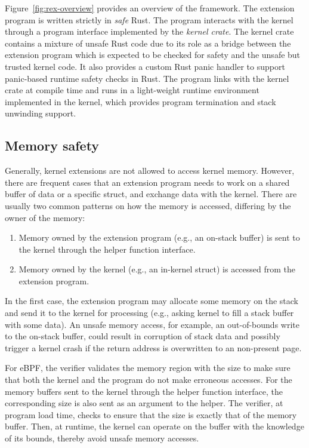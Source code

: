 Figure~\ref{fig:rex-overview} provides an overview of the \projname{} framework.
The extension program is written strictly in \emph{safe} Rust.
The program interacts with the kernel through a program interface implemented
    by the \projname{} \emph{kernel crate}.
The kernel crate contains a mixture of unsafe Rust code due to its role as a
    bridge between the extension program which is expected to be checked for
    safety and the unsafe but trusted kernel code.
It also provides a custom Rust panic handler to support panic-based runtime
    safety checks in Rust.
The program links with the kernel crate at compile time and runs in a
    light-weight runtime environment implemented in the kernel, which provides
    program termination and stack unwinding support.

\subsection{Memory safety}
\label{principle:memsafety}
Generally, kernel extensions are not allowed to access kernel memory.
However, there are frequent cases that an extension program needs to work on a
    shared buffer of data or a specific struct, and exchange data with the
    kernel.
There are usually two common patterns on how the memory is accessed, differing
    by the owner of the memory:
\begin{enumerate}
    \item Memory owned by the extension program (e.g., an on-stack buffer)
        is sent to the kernel through the helper function interface.
    \item Memory owned by the kernel (e.g., an in-kernel struct) is
        accessed from the extension program. %
\end{enumerate}

In the first case, the extension program may allocate some memory on the stack
    and send it to the kernel for processing (e.g., asking kernel to fill a
    stack buffer with some data).
An unsafe memory access, for example, an out-of-bounds write to the on-stack
    buffer, could result in corruption of stack data and possibly trigger a
    kernel crash if the return address is overwritten to an non-present page.

For eBPF, the verifier validates the memory region with the size to make sure
    that both the kernel and the program do not make erroneous accesses.
For the memory buffers sent to the kernel through the helper function interface,
    the corresponding size is also sent as an argument to the helper.
The verifier, at program load time, checks to ensure that the size is exactly
    that of the memory buffer.
Then, at runtime, the kernel can operate on the buffer with the knowledge of
    its bounds, thereby avoid unsafe memory accesses.

